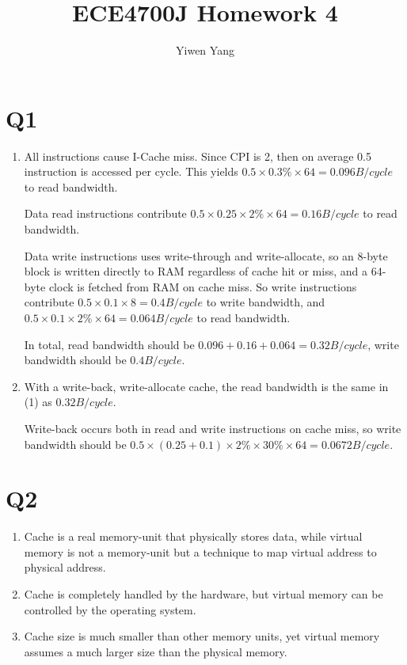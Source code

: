 \documentclass[12pt]{article}
\title{ECE4700J Homework 4}
\author{Yiwen Yang}
\begin{document}
\date{}
\maketitle

\section*{Q1}

	\begin{enumerate}
		\item
			All instructions cause I-Cache miss. Since CPI is 2, then on average 0.5 instruction is accessed per cycle. This yields $0.5\times0.3\%\times64=0.096B/cycle$ to read bandwidth.

			Data read instructions contribute $0.5\times0.25\times2\%\times64=0.16B/cycle$ to read bandwidth.

			Data write instructions uses write-through and write-allocate, so an 8-byte block is written directly to RAM regardless of cache hit or miss, and a 64-byte clock is fetched from RAM on cache miss. So write instructions contribute $0.5\times0.1\times8=0.4B/cycle$ to write bandwidth, and $0.5\times0.1\times2\%\times64=0.064B/cycle$ to read bandwidth.

			In total, read bandwidth should be $0.096+0.16+0.064=0.32B/cycle$, write bandwidth should be $0.4B/cycle$.
		\item
			With a write-back, write-allocate cache, the read bandwidth is the same in (1) as $0.32B/cycle$.

			Write-back occurs both in read and write instructions on cache miss, so write bandwidth should be $0.5\times(0.25+0.1)\times2\%\times30\%\times64=0.0672B/cycle$.
	\end{enumerate}

\section*{Q2}

	\begin{enumerate}
		\item Cache is a real memory-unit that physically stores data, while virtual memory is not a memory-unit but a technique to map virtual address to physical address.
		\item Cache is completely handled by the hardware, but virtual memory can be controlled by the operating system.
		\item Cache size is much smaller than other memory units, yet virtual memory assumes a much larger size than the physical memory.
	\end{enumerate}
\end{document}

